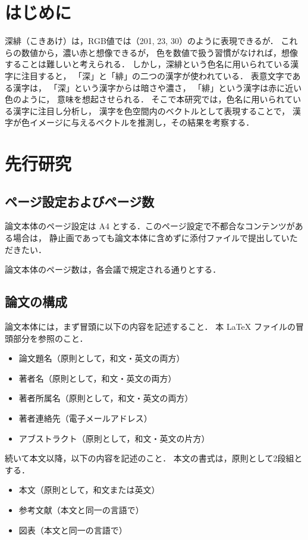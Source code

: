 \documentclass[a4j,twocolumn]{ujarticle} %
\begin{document}
\maketitle
\thispagestyle{myheadings}

\section{はじめに}

深緋（こきあけ）は，RGB値では（201, 23, 30）のように表現できるが．
これらの数値から，濃い赤と想像できるが，
色を数値で扱う習慣がなければ，想像することは難しいと考えられる．
しかし，深緋という色名に用いられている漢字に注目すると，
「深」と「緋」の二つの漢字が使われている．
表意文字である漢字は，
「深」という漢字からは暗さや濃さ，
「緋」という漢字は赤に近い色のように，
意味を想起させられる．
そこで本研究では，色名に用いられている漢字に注目し分析し，
漢字を色空間内のベクトルとして表現することで，
漢字が色イメージに与えるベクトルを推測し，その結果を考察する．

\section{先行研究}

\subsection{ページ設定およびページ数}

論文本体のページ設定は A4 とする．このページ設定で不都合なコンテンツがある場合は，
静止画であっても論文本体に含めずに添付ファイルで提出していただきたい．

論文本体のページ数は，各会議で規定される通りとする．

\subsection{論文の構成}

論文本体には，まず冒頭に以下の内容を記述すること．
本 LaTeX ファイルの冒頭部分を参照のこと．

\begin{itemize}
\item 論文題名（原則として，和文・英文の両方）
\item 著者名（原則として，和文・英文の両方）
\item 著者所属名（原則として，和文・英文の両方）
\item 著者連絡先（電子メールアドレス）
\item アブストラクト（原則として，和文・英文の片方）
\end{itemize}
続いて本文以降，以下の内容を記述のこと．
本文の書式は，原則として2段組とする．
\begin{itemize}
\item 本文（原則として，和文または英文）
\item 参考文献（本文と同一の言語で）
\item 図表（本文と同一の言語で）
\end{itemize}
\end{document}
